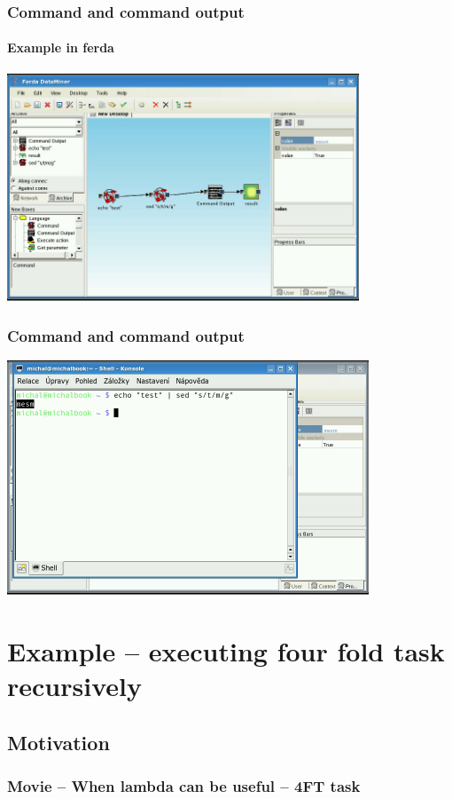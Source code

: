 \documentclass{beamer}
\begin{document}
\begin{frame}
	\frametitle{Command and command output}
	\framesubtitle{Example in ferda}
	\includegraphics[width=10.5cm]{command2.png}
\end{frame}

\begin{frame}
	\frametitle{Command and command output}
	\subtitle{The same in console}
	\includegraphics[width=10.8cm]{command3.png}
\end{frame}

\section{Example -- executing four fold task recursively}
\subsection{Motivation}
\begin{frame}
	\frametitle{Movie -- When lambda can be useful -- 4FT task}
\end{frame}
\end{document}
